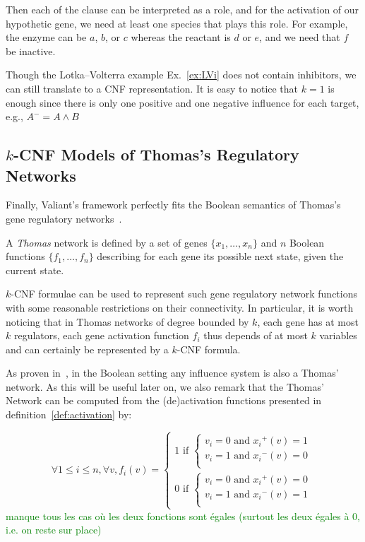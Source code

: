 \documentclass{llncs}
\newcommand{\sylvain}[1]{\textcolor{green}{#1}}
\begin{document}
Then each of the clause can be interpreted as a role, and for the activation of our hypothetic gene, we need at least one species that plays this role. For example, the enzyme can be $a$, $b$, or $c$ whereas 
the reactant is $d$ or $e$, and we need that $f$ be inactive.


\begin{example}
   Though the Lotka--Volterra example Ex.~\ref{ex:LVi} does not contain
   inhibitors, we can still translate to a CNF representation. It is easy to
   notice that $k=1$ is enough since there is only one positive and one
   negative influence for each target, e.g., $A^- = A\wedge B$

\end{example}


\subsection{$k$-CNF Models of Thomas's Regulatory Networks}

Finally, Valiant's framework perfectly fits the Boolean semantics of Thomas's gene
regulatory networks~\cite{Thomas73jtb}.

\begin{definition}
   A \emph{Thomas} network is defined by a set of genes $\{x_1,\dots,x_n\}$
   and $n$ Boolean functions $\{f_1,\dots,f_n\}$ describing for each gene its
   possible next state, given the current state.
\end{definition}

$k$-CNF formulae can be used to represent such gene regulatory network functions with some reasonable restrictions on their connectivity.
In particular, it is worth noticing that in Thomas networks of degree bounded by $k$,
each gene has at most $k$ regulators, each gene activation function $f_i$ thus depends of at most $k$ variables
and can certainly be represented by a $k$-CNF formula.

As proven in~\cite{FMRS16cmsb}, in the Boolean setting any influence system is
also a Thomas' network.
As this will be useful later on, we also remark that the Thomas' Network can be computed from the (de)activation functions presented in definition~\ref{def:activation} by:

\[
\forall 1 \leq i \leq n, \forall v, f_i(v) = \left\{\begin{array}{l}
1 \text{ if } \left\{\begin{array}{l}
v_i = 0 \text{ and } {x_i}^+(v) = 1\\
v_i = 1 \text{ and } {x_i}^-(v) = 0 \\
\end{array}\right.\\[1em]
0 \text{ if } \left\{\begin{array}{l}
v_i = 0 \text{ and } {x_i}^+(v) = 0\\
v_i = 1 \text{ and } {x_i}^-(v) = 1\\
\end{array}\right.
\end{array}\right.
\]
\sylvain{manque tous les cas où les deux fonctions sont égales (surtout les
deux égales à 0, i.e. on reste sur place)}
\end{document}
